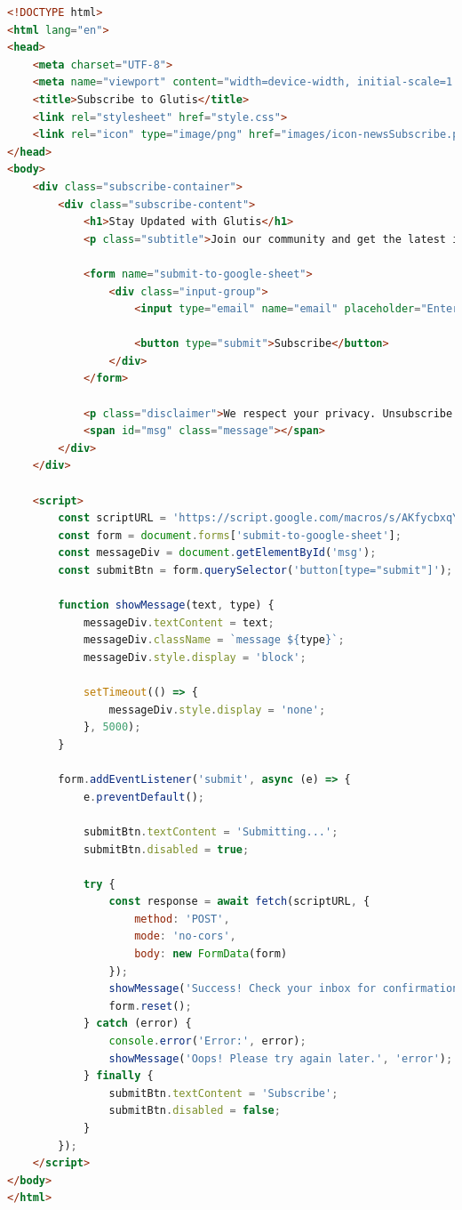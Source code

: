 \begin{lstlisting}[language = HTML]
<!DOCTYPE html>
<html lang="en">
<head>
    <meta charset="UTF-8">
    <meta name="viewport" content="width=device-width, initial-scale=1.0">
    <title>Subscribe to Glutis</title>
    <link rel="stylesheet" href="style.css">
    <link rel="icon" type="image/png" href="images/icon-newsSubscribe.pdf">
</head>
<body>
    <div class="subscribe-container">
        <div class="subscribe-content">
            <h1>Stay Updated with Glutis</h1>
            <p class="subtitle">Join our community and get the latest insights on technology, data, and cloud delivered straight to your inbox.</p>
            
            <form name="submit-to-google-sheet">
                <div class="input-group">
                    <input type="email" name="email" placeholder="Enter your email address" required>

                    <button type="submit">Subscribe</button>
                </div>
            </form>

            <p class="disclaimer">We respect your privacy. Unsubscribe at any time.</p>
            <span id="msg" class="message"></span>
        </div>
    </div>

    <script>
        const scriptURL = 'https://script.google.com/macros/s/AKfycbxqYcEJfxatmSPbBaNdiR8XOfWrTJjOYYLiPxeeo4Xton24qq2IQrHCHuEYG8Bgcbm5/exec';
        const form = document.forms['submit-to-google-sheet'];
        const messageDiv = document.getElementById('msg');
        const submitBtn = form.querySelector('button[type="submit"]');

        function showMessage(text, type) {
            messageDiv.textContent = text;
            messageDiv.className = `message ${type}`;
            messageDiv.style.display = 'block';
            
            setTimeout(() => {
                messageDiv.style.display = 'none';
            }, 5000);
        }

        form.addEventListener('submit', async (e) => {
            e.preventDefault();
            
            submitBtn.textContent = 'Submitting...';
            submitBtn.disabled = true;

            try {
                const response = await fetch(scriptURL, {
                    method: 'POST',
                    mode: 'no-cors', 
                    body: new FormData(form)
                });
                showMessage('Success! Check your inbox for confirmation.', 'success');
                form.reset();
            } catch (error) {
                console.error('Error:', error);
                showMessage('Oops! Please try again later.', 'error');
            } finally {
                submitBtn.textContent = 'Subscribe';
                submitBtn.disabled = false;
            }
        });
    </script>
</body>
</html>
\end{lstlisting}

